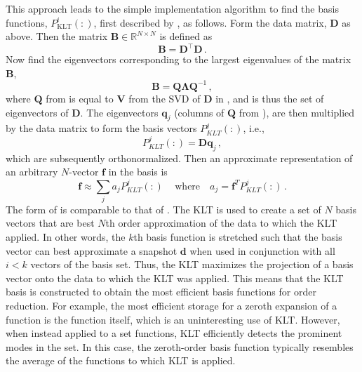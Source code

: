 This approach leads to the simple implementation algorithm to find the basis 
functions, $P^i_{\text{KLT}}(:)$, first described by \citet{Meyer2002}, as 
follows. Form the data matrix, $\mathbf{D}$ as above.  Then the matrix 
$\mathbf{B} \in \mathbb{R}^{N\times N}$ is defined as
\begin{equation}
    \mathbf{B} = \mathbf{D}^{\intercal}\mathbf{D} \, .
    \label{eq:KLT}
\end{equation}
Now find the eigenvectors corresponding to the largest eigenvalues of the matrix $\mathbf{B}$,
\begin{equation}
    \label{eq:SVD_of_B}
    \mathbf{B} = \mathbf{Q}\mathbf{\Lambda}\mathbf{Q}^{-1}\, ,
\end{equation}
where $\mathbf{Q}$ from  is equal 
to $\mathbf{V}$ 
from the SVD of $\mathbf{D}$ in , and is thus the set of 
eigenvectors of 
$\mathbf{D}$. The eigenvectors $\mathbf{q}_j$ (columns of $\mathbf{Q}$ from 
), are 
then multiplied by the data matrix to form the basis vectors $P^j_{KLT}(:)$, 
i.e.,
\begin{equation}
    P^j_{KLT}(:) = \mathbf{D}\mathbf{q}_j \, ,
\end{equation}
which are subsequently orthonormalized.  Then an approximate representation of 
an arbitrary $N$-vector $\mathbf{f}$ in the basis is 
\begin{equation}
    \mathbf{f} \approx \sum_j a_j P^j_{KLT}(:) \, \quad \text{where} \quad a_j 
    = 
    \mathbf{f}^T P^j_{KLT}(:) \, .
    \label{eq:KLT_def}
\end{equation}
The form of  is comparable to that of 
.  The KLT is used to 
create a set of $N$ basis vectors that are best $N$th order approximation of 
the data to which the KLT applied.  In other words, the $k$th basis function is 
stretched such that the basis vector can best approximate a snapshot 
$\mathbf{d}$ when used in conjunction with all $i<k$ vectors of the basis set.  
Thus, the KLT maximizes the projection of a basis vector onto the data to 
which the KLT was applied.  This means that the KLT basis is constructed to 
obtain the most efficient basis functions for order reduction. For example, the 
most efficient storage for a zeroth 
expansion of a function is the function itself, which is an uninteresting use 
of KLT.  However, when instead applied to a set functions, KLT 
efficiently detects the prominent 
modes in the set.  In this case, the zeroth-order basis function 
typically resembles the average of the functions to which KLT is 
applied.

